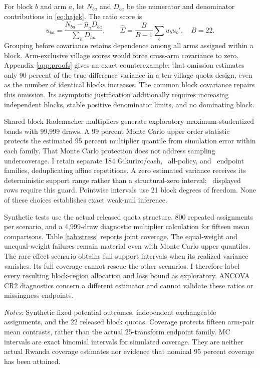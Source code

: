 \documentclass[11pt]{article}
\begin{document}
For block $b$ and arm $a$, let $N_{ba}$ and $D_{ba}$ be the numerator and denominator contributions in \eqref{eq:hajek}. The ratio score is
\begin{equation}
 u_{ba}=\frac{N_{ba}-\widehat\mu_aD_{ba}}{\sum_hD_{ha}},\qquad
 \widehat\Sigma=\frac{B}{B-1}\sum_bu_bu_b',\quad B=22.\label{eq:blockcov}
\end{equation}
Grouping before covariance retains dependence among all arms assigned within a block. Arm-exclusive village scores would force cross-arm covariance to zero. Appendix \ref{app:proofs} gives an exact counterexample: that omission estimates only 90 percent of the true difference variance in a ten-village quota design, even as the number of identical blocks increases. The common block covariance repairs this omission. Its asymptotic justification additionally requires increasing independent blocks, stable positive denominator limits, and no dominating block.

Shared block Rademacher multipliers generate exploratory maximum-studentized bands with 99,999 draws. A 99 percent Monte Carlo upper order statistic protects the estimated 95 percent multiplier quantile from simulation error within each family. That Monte Carlo protection does not address sampling undercoverage. I retain separate 184 Gikuriro/cash, \PairFamilyN\ all-policy, and \BoundFamilyN\ endpoint families, deduplicating affine repetitions. A zero estimated variance receives its deterministic support range rather than a structural-zero interval; \GuardedRowN\ displayed rows require this guard. Pointwise intervals use 21 block degrees of freedom. None of these choices establishes exact weak-null inference.

Synthetic tests use the actual released quota structure, 800 repeated assignments per scenario, and a 4,999-draw diagnostic multiplier calculation for fifteen mean comparisons. Table \ref{tab:stress} reports joint coverage. The equal-weight and unequal-weight failures remain material even with Monte Carlo upper quantiles. The rare-effect scenario obtains full-support intervals when its realized variance vanishes. Its full coverage cannot rescue the other scenarios. I therefore label every resulting block-region allocation and loss bound as exploratory. ANCOVA CR2 diagnostics concern a different estimator and cannot validate these ratios or missingness endpoints.

\begin{table}[t]
\centering\caption{Finite-block stress diagnostics for the exploratory approximation}\label{tab:stress}
\resizebox{\textwidth}{!}{}
\begin{minipage}{\textwidth}\footnotesize\emph{Notes:} Synthetic fixed potential outcomes, independent exchangeable assignments, and the 22 released block quotas. Coverage protects fifteen arm-pair mean contrasts, rather than the actual 25-transform endpoint family. MC intervals are exact binomial intervals for simulated coverage. They are neither actual Rwanda coverage estimates nor evidence that nominal 95 percent coverage has been attained.\end{minipage}
\end{table}
\end{document}
